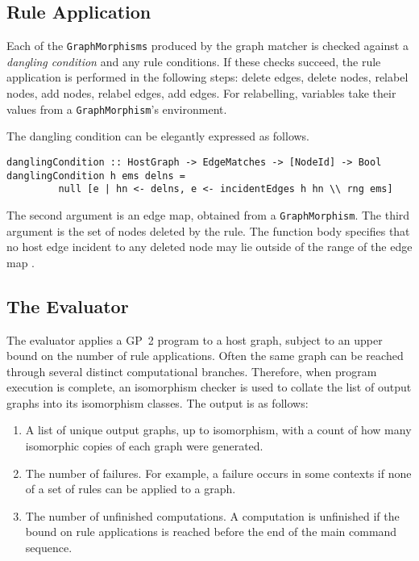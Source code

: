 \subsection{Rule Application}
Each of the \texttt{GraphMorphisms} produced by the graph matcher is checked against a \emph{dangling condition} and any rule conditions. If these checks succeed, the rule application is performed in the following steps: delete edges, delete nodes, relabel nodes, add nodes, relabel edges, add edges. For relabelling, variables take their values from a \texttt{GraphMorphism}'s environment. 

The dangling condition can be elegantly expressed as follows.
\begin{verbatim}
danglingCondition :: HostGraph -> EdgeMatches -> [NodeId] -> Bool
danglingCondition h ems delns = 
         null [e | hn <- delns, e <- incidentEdges h hn \\ rng ems]
\end{verbatim}

The second argument is an edge map, obtained from a \texttt{GraphMorphism}. The third argument is the set of nodes deleted by the rule. The function body specifies that no host edge  incident to any deleted node  may lie outside of the range of the edge map .

\subsection{The Evaluator}\label{sec:eval}
The evaluator applies a GP~2 program to a host graph, subject to an upper bound on the number of rule applications. Often the same graph can be reached through several distinct computational branches. Therefore, when program execution is complete, an isomorphism checker is used to collate the list of output graphs into its isomorphism classes. The output is as follows:

\begin{enumerate}
\item A list of unique output graphs, up to isomorphism, with a count of how many isomorphic copies of each graph were generated.
\item The number of failures. For example, a failure occurs in some contexts if none of a set of rules can be applied to a graph.
\item The number of unfinished computations. A computation is unfinished if the bound on rule applications is reached before the end of the main command sequence.
\end{enumerate}

